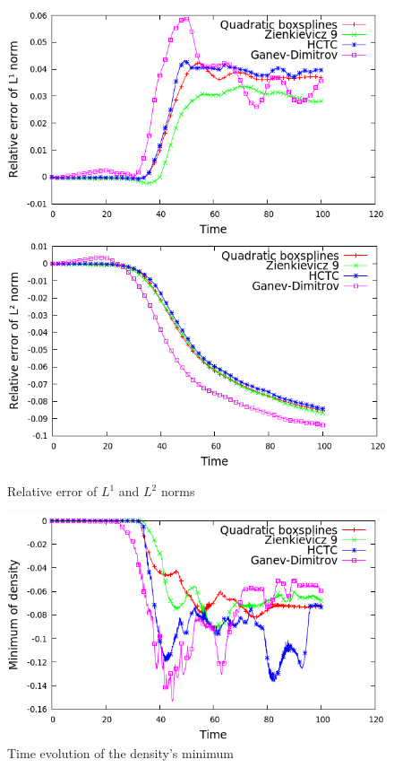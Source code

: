 \documentclass[proc]{edpsmath}
\begin{document}
\begin{figure}[h!]
	\includegraphics[scale=0.3]{figures/l1norm_cg.png}
	\includegraphics[scale=0.3]{figures/l2norm_cg.png}
	\caption{Relative error of $L^1$ and $L^2$ norms}
\end{figure}


\begin{figure}[h!]
	\includegraphics[scale=0.3]{figures/min_cg.png}
	\caption{Time evolution of the density's minimum}
\end{figure}
\end{document}
